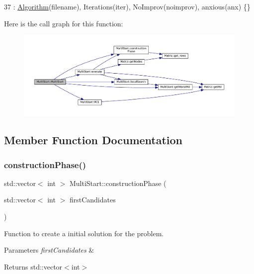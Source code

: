 \begin{DoxyCode}
37 : \hyperlink{classAlgorithm_a89df1d2c6751f70733f38daa0ee2a13b}{Algorithm}(filename), Iterations(iter), NoImprov(noimprov), anxious(anx) \{\}
\end{DoxyCode}
Here is the call graph for this function\+:\nopagebreak
\begin{figure}[H]
\begin{center}
\leavevmode
\includegraphics[width=350pt]{classMultiStart_ae16c330042c4b1dfb87dae8312d07a65_cgraph}
\end{center}
\end{figure}


\subsection{Member Function Documentation}
\mbox{\label{classMultiStart_a29c5796648ede3e6c7fe8ca8043f8187}} 
\subsubsection{\texorpdfstring{construction\+Phase()}{constructionPhase()}}
{\footnotesize\ttfamily std\+::vector$<$ int $>$ Multi\+Start\+::construction\+Phase (\begin{DoxyParamCaption}\item[{std\+::vector$<$ int $>$}]{first\+Candidates }\end{DoxyParamCaption})}



Function to create a initial solution for the problem. 


\begin{DoxyParams}{Parameters}
{\em first\+Candidates} & \\
\hline
\end{DoxyParams}
\begin{DoxyReturn}{Returns}
std\+::vector$<$int$>$ 
\end{DoxyReturn}

